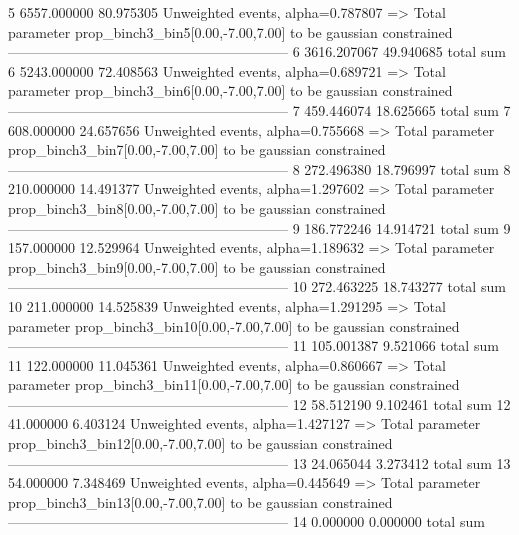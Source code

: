 5          6557.000000     80.975305       Unweighted events, alpha=0.787807
  => Total parameter prop_binch3_bin5[0.00,-7.00,7.00] to be gaussian constrained
------------------------------------------------------------
6          3616.207067     49.940685       total sum                     
6          5243.000000     72.408563       Unweighted events, alpha=0.689721
  => Total parameter prop_binch3_bin6[0.00,-7.00,7.00] to be gaussian constrained
------------------------------------------------------------
7          459.446074      18.625665       total sum                     
7          608.000000      24.657656       Unweighted events, alpha=0.755668
  => Total parameter prop_binch3_bin7[0.00,-7.00,7.00] to be gaussian constrained
------------------------------------------------------------
8          272.496380      18.796997       total sum                     
8          210.000000      14.491377       Unweighted events, alpha=1.297602
  => Total parameter prop_binch3_bin8[0.00,-7.00,7.00] to be gaussian constrained
------------------------------------------------------------
9          186.772246      14.914721       total sum                     
9          157.000000      12.529964       Unweighted events, alpha=1.189632
  => Total parameter prop_binch3_bin9[0.00,-7.00,7.00] to be gaussian constrained
------------------------------------------------------------
10         272.463225      18.743277       total sum                     
10         211.000000      14.525839       Unweighted events, alpha=1.291295
  => Total parameter prop_binch3_bin10[0.00,-7.00,7.00] to be gaussian constrained
------------------------------------------------------------
11         105.001387      9.521066        total sum                     
11         122.000000      11.045361       Unweighted events, alpha=0.860667
  => Total parameter prop_binch3_bin11[0.00,-7.00,7.00] to be gaussian constrained
------------------------------------------------------------
12         58.512190       9.102461        total sum                     
12         41.000000       6.403124        Unweighted events, alpha=1.427127
  => Total parameter prop_binch3_bin12[0.00,-7.00,7.00] to be gaussian constrained
------------------------------------------------------------
13         24.065044       3.273412        total sum                     
13         54.000000       7.348469        Unweighted events, alpha=0.445649
  => Total parameter prop_binch3_bin13[0.00,-7.00,7.00] to be gaussian constrained
------------------------------------------------------------
14         0.000000        0.000000        total sum                     
